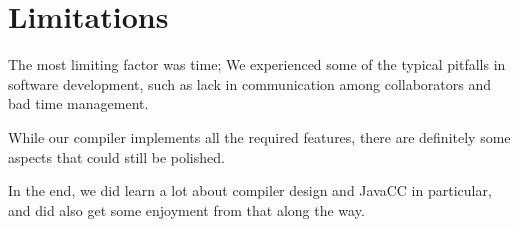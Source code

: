 \documentclass[a4paper, 12pt, parskip=full*]{scrreprt}
\begin{document}
\chapter{Limitations}


The most limiting factor was time; We experienced some of the typical pitfalls in software development, such as lack in communication among collaborators and bad time management.

While our compiler implements all the required features, there are definitely some aspects that could still be polished. 

In the end, we did learn a lot about compiler design and JavaCC in particular, and did also get some enjoyment from that along the way.
\end{document}
